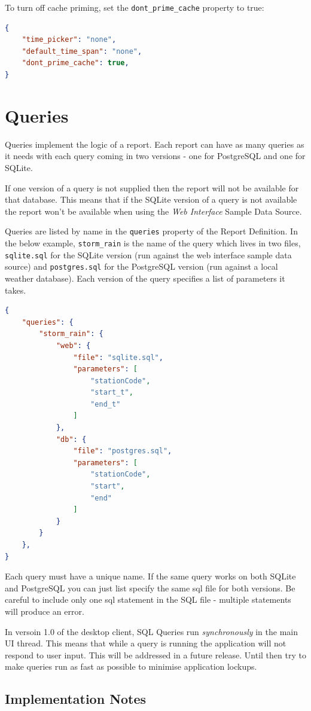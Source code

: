 \documentclass[a4paper,10pt]{book}
\begin{document}
To turn off cache priming, set the \verb|dont_prime_cache| property to true:
\begin{lstlisting}[language=json]
{
	"time_picker": "none",
	"default_time_span": "none",
	"dont_prime_cache": true,
}
\end{lstlisting}



\chapter{Queries}
Queries implement the logic of a report. Each report can have as many queries as it needs with each query coming in two versions - one for PostgreSQL and one for SQLite. 

If one version of a query is not supplied then the report will not be available for that database. This means that if the SQLite version of a query is not available the report won't be available when using the \emph{Web Interface} Sample Data Source.

Queries are listed by name in the \verb|queries| property of the Report Definition. In the below example, \verb|storm_rain| is the name of the query which lives in two files, \verb|sqlite.sql| for the SQLite version (run against the web interface sample data source) and \verb|postgres.sql| for the PostgreSQL version (run against a local weather database). Each version of the query specifies a list of parameters it takes.
\begin{lstlisting}[language=json]
{
	"queries": {
		"storm_rain": {
			"web": {
				"file": "sqlite.sql",
				"parameters": [
					"stationCode",
					"start_t",
					"end_t"
				]
			},
			"db": {
				"file": "postgres.sql",
				"parameters": [
					"stationCode",
					"start",
					"end"
				]
			}
		}
	},
}
\end{lstlisting}
Each query must have a unique name. If the same query works on both SQLite and PostgreSQL you can just list specify the same sql file for both versions. Be careful to include only one sql statement in the SQL file - multiple statements will produce an error.

In versoin 1.0 of the desktop client, SQL Queries run \emph{synchronously} in the main UI thread. This means that while a query is running the application will not respond to user input. This will be addressed in a future release. Until then try to make queries run as fast as possible to minimise application lockups.

\section{Implementation Notes}
\end{document}
